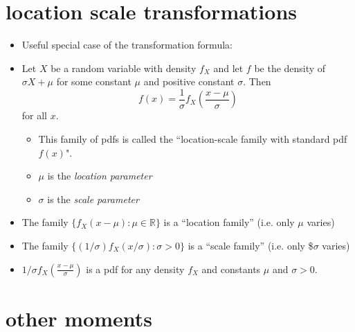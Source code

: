 \section{location scale transformations}
\label{sec-4}

\begin{itemize}
\item Useful special case of the transformation formula:
\item Let $X$ be a random variable with density $f_X$ and let $f$ be
      the density of $\sigma X + \mu$ for some constant $\mu$ and
      positive constant $\sigma$.  Then \[f(x) = \frac{1}{\sigma}
      f_X\left(\frac{x - \mu}{\sigma}\right)\] for all $x$.
\begin{itemize}
\item This family of pdfs is called the ``location-scale family
        with standard pdf $f(x)$".
\item $\mu$ is the \emph{location parameter}
\item $\sigma$ is the \emph{scale parameter}
\end{itemize}
\item The family $\{f_X(x - \mu) : \mu \in \mathbb{R}\}$ is a
      ``location family'' (i.e. only $\mu$ varies)
\item The family $\{(1/\sigma) f_X(x/\sigma) : \sigma > 0\}$ is a
      ``scale family'' (i.e. only \$$\sigma$ varies)
\item $1/\sigma f_X(\frac{x - \mu}{\sigma})$ is a pdf for any density
      $f_X$ and constants $\mu$ and $\sigma > 0$.
\end{itemize}
\section{other moments}
\label{sec-5}

